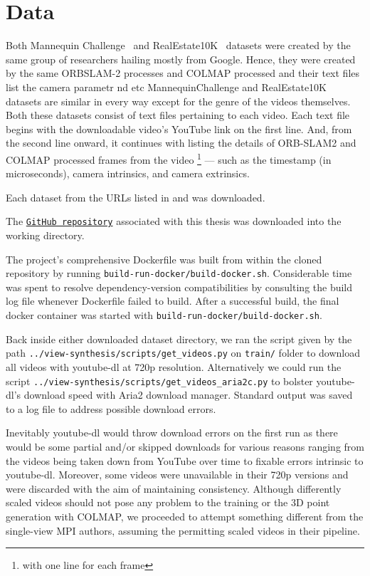 \section{Data}\label{sec:data} 

Both Mannequin Challenge~\cite{li2019learning} and RealEstate10K~\cite{zhou2018stereo} datasets were created by the same group of researchers hailing mostly from Google. Hence, they were created by the same ORBSLAM-2 processes and COLMAP processed and their text files list the camera parametr nd etc
MannequinChallenge and RealEstate10K datasets are similar in every way except for the genre of the videos themselves. Both these datasets consist of text files pertaining to each video. Each text file begins with the downloadable video’s YouTube link on the first line. And, from the second line onward, it continues with listing the details of ORB-SLAM2 and COLMAP processed frames from the video \footnote{with one line for each frame} --- such as the timestamp (in microseconds), camera intrinsics, and camera extrinsics.
    
Each dataset from the URLs listed in \cite{zhou2018stereo} and \cite{li2019learning} was downloaded. 
    
The \href{https://github.com/au001/view-synthesis.git}{\texttt{GitHub repository}} associated with this thesis was downloaded into the working directory.

The project's comprehensive Dockerfile was built from within the cloned repository by running \texttt{build-run-docker/build-docker.sh}. Considerable time was spent to resolve dependency-version compatibilities by consulting the build log file whenever Dockerfile failed to build. After a successful build, the final docker container was started with \texttt{build-run-docker/build-docker.sh}.
    
Back inside either downloaded dataset directory, we ran the script given by the path \texttt{../view-synthesis/scripts/get\_videos.py} on \texttt{train/} folder to download all videos with youtube-dl at 720p resolution. Alternatively we could run the script \texttt{../view-synthesis/scripts/get\_videos\_aria2c.py} to bolster youtube-dl’s download speed with Aria2 download manager. Standard output was saved to a log file to address possible download errors. 
    
Inevitably youtube-dl would throw download errors on the first run as there would be some partial and/or skipped downloads for various reasons ranging from the videos being taken down from YouTube over time to fixable errors intrinsic to youtube-dl. Moreover, some videos were unavailable in their 720p versions and were discarded with the aim of maintaining consistency. Although differently scaled videos should not pose any problem to the training or the 3D point generation with COLMAP, we proceeded to attempt something different from the single-view MPI authors, assuming the permitting scaled videos in their pipeline.
    
